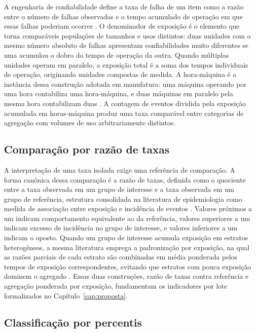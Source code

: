 A engenharia de confiabilidade define a taxa de falha de um item como a razão entre o número de falhas observadas e o tempo acumulado de operação em que essas falhas poderiam ocorrer \cite{oconnor2012reliability}. O denominador de exposição é o elemento que torna comparáveis populações de tamanhos e usos distintos: duas unidades com o mesmo número absoluto de falhas apresentam confiabilidades muito diferentes se uma acumulou o dobro do tempo de operação da outra. Quando múltiplas unidades operam em paralelo, a exposição total é a soma dos tempos individuais de operação, originando unidades compostas de medida. A hora-máquina é a instância dessa construção adotada em manufatura: uma máquina operando por uma hora contabiliza uma hora-máquina, e duas máquinas em paralelo pela mesma hora contabilizam duas \cite{oconnor2012reliability}. A contagem de eventos dividida pela exposição acumulada em horas-máquina produz uma taxa comparável entre categorias de agregação com volumes de uso arbitrariamente distintos.

\subsection{Comparação por razão de taxas}
\label{subsec:metricas_razao}

A interpretação de uma taxa isolada exige uma referência de comparação. A forma canônica dessa comparação é a razão de taxas, definida como o quociente entre a taxa observada em um grupo de interesse e a taxa observada em um grupo de referência, estrutura consolidada na literatura de epidemiologia como medida de associação entre exposição e incidência de eventos \cite{rothman2008epidemiology}. Valores próximos a um indicam comportamento equivalente ao da referência, valores superiores a um indicam excesso de incidência no grupo de interesse, e valores inferiores a um indicam o oposto. Quando um grupo de interesse acumula exposição em estratos heterogêneos, a mesma literatura emprega a padronização por exposição, na qual as razões parciais de cada estrato são combinadas em média ponderada pelos tempos de exposição correspondentes, evitando que estratos com pouca exposição dominem o agregado \cite{rothman2008epidemiology}. Essas duas construções, razão de taxas contra referência e agregação ponderada por exposição, fundamentam os indicadores por lote formalizados no Capítulo~\ref{cap:proposta}.

\subsection{Classificação por percentis}
\label{subsec:metricas_percentil}

